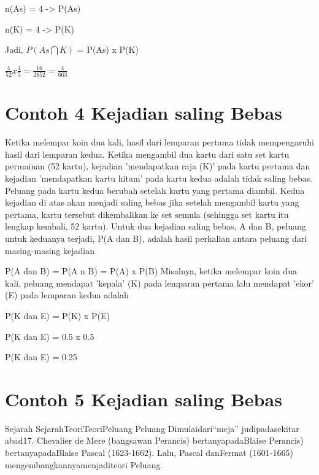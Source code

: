 \documentclass[11pt,fleqn]{book} %
\begin{document}
{\vspace{0.5in}

n(As) = 4 -> P(As)

\vspace{0.5in}

n(K) = 4 -> P(K) 

\vspace{0.5in}

Jadi, $ P(As\bigcap K) $ = P(As) x P(K) 

$ \frac{4}{52} x \frac{4}{5} = \frac{16}{2652} = \frac{4}{663} $

\section{Contoh 4 Kejadian saling Bebas}

Ketika melempar koin dua kali, hasil dari lemparan pertama tidak mempengaruhi hasil dari lemparan kedua.
Ketika mengambil dua kartu dari satu set kartu permainan (52 kartu), kejadian 'mendapatkan raja (K)' pada kartu pertama dan kejadian 'mendapatkan kartu hitam' pada kartu kedua adalah
tidak saling bebas. Peluang pada kartu kedua berubah setelah kartu yang pertama diambil. 
\vspace{0.3in} 
Kedua kejadian di atas akan menjadi saling bebas jika setelah mengambil kartu yang pertama, kartu tersebut dikembalikan ke set semula (sehingga set kartu itu lengkap kembali, 52 kartu).
\vspace{0.3in} 
Untuk dua kejadian saling bebas, A dan B, peluang untuk keduanya terjadi, P(A dan B), adalah hasil perkalian antara peluang dari masing-masing kejadian

\vspace{0.5in}
P(A dan B) = P(A n B) = P(A) x P(B)
Misalnya, ketika melempar koin dua kali, peluang mendapat 'kepala' (K) pada lemparan pertama lalu mendapat 'ekor' (E) pada lemparan kedua adalah

\vspace{0.5in}
P(K dan E) = P(K) x P(E)

\vspace{0.5in}
P(K dan E) = 0.5 x 0.5

\vspace{0.5in}
P(K dan E) = 0.25

\section{Contoh 5 Kejadian saling Bebas}

Sejarah SejarahTeoriTeoriPeluang Peluang
Dimulaidari“meja” judipadasekitar abad17.
Chevalier de Mere (bangsawan Perancis) bertanyapadaBlaise Perancis) bertanyapadaBlaise Pascal (1623-1662).
Lalu, Pascal danFermat (1601-1665) mengembangkannyamenjaditeori Peluang.

}
\end{document}
